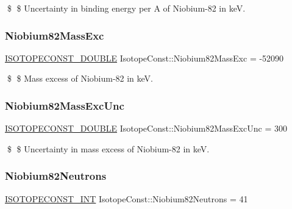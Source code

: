\$ \$ Uncertainty in binding energy per A of Niobium-\/82 in keV. \mbox{\label{group___isotope_const-_niobium-_nb82_ga648d309edaf774e672ef95d603114877}} 
\subsubsection{\texorpdfstring{Niobium82\+Mass\+Exc}{Niobium82MassExc}}
{\footnotesize\ttfamily \mbox{\hyperlink{group___isotope_const-_macros_ga8f45a7272ce02c0b4c65c44636ed719a}{I\+S\+O\+T\+O\+P\+E\+C\+O\+N\+S\+T\+\_\+\+D\+O\+U\+B\+LE}} Isotope\+Const\+::\+Niobium82\+Mass\+Exc = -\/52090}

\$ \$ Mass excess of Niobium-\/82 in keV. \mbox{\label{group___isotope_const-_niobium-_nb82_ga0f05824c9871d005713497aa447af3e2}} 
\subsubsection{\texorpdfstring{Niobium82\+Mass\+Exc\+Unc}{Niobium82MassExcUnc}}
{\footnotesize\ttfamily \mbox{\hyperlink{group___isotope_const-_macros_ga8f45a7272ce02c0b4c65c44636ed719a}{I\+S\+O\+T\+O\+P\+E\+C\+O\+N\+S\+T\+\_\+\+D\+O\+U\+B\+LE}} Isotope\+Const\+::\+Niobium82\+Mass\+Exc\+Unc = 300}

\$ \$ Uncertainty in mass excess of Niobium-\/82 in keV. \mbox{\label{group___isotope_const-_niobium-_nb82_ga42cd0cc27c420fca08c58477e9d351bc}} 
\subsubsection{\texorpdfstring{Niobium82\+Neutrons}{Niobium82Neutrons}}
{\footnotesize\ttfamily \mbox{\hyperlink{group___isotope_const-_macros_ga5f18360b3e99483a35c32d789e62621c}{I\+S\+O\+T\+O\+P\+E\+C\+O\+N\+S\+T\+\_\+\+I\+NT}} Isotope\+Const\+::\+Niobium82\+Neutrons = 41}

